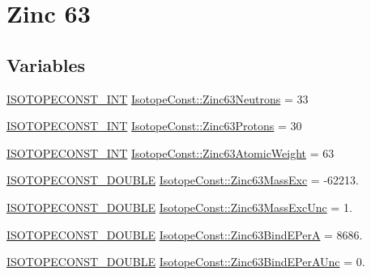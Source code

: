 \hypertarget{group___isotope_const-_zinc-_zn63}{}\section{Zinc 63}
\label{group___isotope_const-_zinc-_zn63}
\subsection*{Variables}
\begin{DoxyCompactItemize}
\item 
\mbox{\hyperlink{group___isotope_const-_macros_ga5f18360b3e99483a35c32d789e62621c}{I\+S\+O\+T\+O\+P\+E\+C\+O\+N\+S\+T\+\_\+\+I\+NT}} \mbox{\hyperlink{group___isotope_const-_zinc-_zn63_ga7bcf9535144b595d02b5cf30c77ea062}{Isotope\+Const\+::\+Zinc63\+Neutrons}} = 33
\item 
\mbox{\hyperlink{group___isotope_const-_macros_ga5f18360b3e99483a35c32d789e62621c}{I\+S\+O\+T\+O\+P\+E\+C\+O\+N\+S\+T\+\_\+\+I\+NT}} \mbox{\hyperlink{group___isotope_const-_zinc-_zn63_ga91542f491e9195a34182bb26367e544a}{Isotope\+Const\+::\+Zinc63\+Protons}} = 30
\item 
\mbox{\hyperlink{group___isotope_const-_macros_ga5f18360b3e99483a35c32d789e62621c}{I\+S\+O\+T\+O\+P\+E\+C\+O\+N\+S\+T\+\_\+\+I\+NT}} \mbox{\hyperlink{group___isotope_const-_zinc-_zn63_gad5361fec700da295d9391bcbee80a3dc}{Isotope\+Const\+::\+Zinc63\+Atomic\+Weight}} = 63
\item 
\mbox{\hyperlink{group___isotope_const-_macros_ga8f45a7272ce02c0b4c65c44636ed719a}{I\+S\+O\+T\+O\+P\+E\+C\+O\+N\+S\+T\+\_\+\+D\+O\+U\+B\+LE}} \mbox{\hyperlink{group___isotope_const-_zinc-_zn63_ga1c304ecfd48ba069b213e58df3020a7e}{Isotope\+Const\+::\+Zinc63\+Mass\+Exc}} = -\/62213.
\item 
\mbox{\hyperlink{group___isotope_const-_macros_ga8f45a7272ce02c0b4c65c44636ed719a}{I\+S\+O\+T\+O\+P\+E\+C\+O\+N\+S\+T\+\_\+\+D\+O\+U\+B\+LE}} \mbox{\hyperlink{group___isotope_const-_zinc-_zn63_ga30e2590d4fc21057c0b57267a9cf42aa}{Isotope\+Const\+::\+Zinc63\+Mass\+Exc\+Unc}} = 1.
\item 
\mbox{\hyperlink{group___isotope_const-_macros_ga8f45a7272ce02c0b4c65c44636ed719a}{I\+S\+O\+T\+O\+P\+E\+C\+O\+N\+S\+T\+\_\+\+D\+O\+U\+B\+LE}} \mbox{\hyperlink{group___isotope_const-_zinc-_zn63_gaf4293dc5122cb2fdc4b144248fe54baf}{Isotope\+Const\+::\+Zinc63\+Bind\+E\+PerA}} = 8686.
\item 
\mbox{\hyperlink{group___isotope_const-_macros_ga8f45a7272ce02c0b4c65c44636ed719a}{I\+S\+O\+T\+O\+P\+E\+C\+O\+N\+S\+T\+\_\+\+D\+O\+U\+B\+LE}} \mbox{\hyperlink{group___isotope_const-_zinc-_zn63_gae4492686b3cb7bd0c008abb0647c8ca7}{Isotope\+Const\+::\+Zinc63\+Bind\+E\+Per\+A\+Unc}} = 0.

\end{DoxyCompactItemize}
